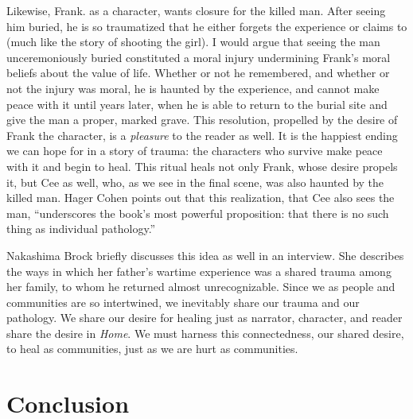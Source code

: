 \documentclass[12pt]{article}
\begin{document}
Likewise, Frank. as a character, wants closure for the killed man. After seeing
him buried, he is so traumatized that he either forgets the experience or
claims to (much like the story of shooting the girl).\autocite[p.
5-6]{Morrison12} I would argue that seeing the man unceremoniously buried
constituted a moral injury undermining Frank's moral beliefs about the value of
life. Whether or not he remembered, and whether or not the injury was moral, he
is haunted by the experience, and cannot make peace with it until years later,
when he is able to return to the burial site and give the man a proper, marked
grave. This resolution, propelled by the desire of Frank the character, is a
\emph{pleasure} to the reader as well. It is the happiest ending we can hope
for in a story of trauma: the characters who survive make peace with it and
begin to heal. This ritual heals not only Frank, whose desire propels it, but
Cee as well, who, as we see in the final scene, was also haunted by the killed
man. Hager Cohen points out that this realization, that Cee also sees the man,
``underscores the book's most powerful proposition: that there is no such thing
as individual pathology.''\autocite{Cohen12}

Nakashima Brock briefly discusses this idea as well in an interview. She
describes the ways in which her father's wartime experience was a shared trauma
among her family, to whom he returned almost
unrecognizable.\autocite{Brock15} Since we as people and communities are
so intertwined, we inevitably share our trauma and our pathology. We share our
desire for healing just as narrator, character, and reader share the desire in
\emph{Home}. We must harness this connectedness, our shared desire, to heal as
communities, just as we are hurt as communities.

\section{Conclusion}
\end{document}
